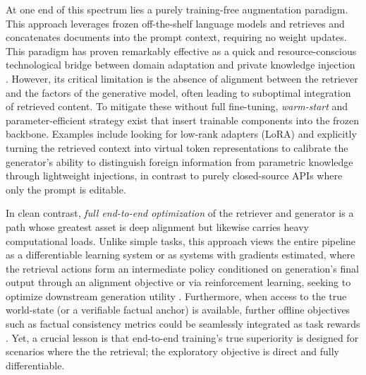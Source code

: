 \documentclass[11pt,a4paper]{article}
\begin{document}
At one end of this spectrum lies a purely training-free augmentation paradigm. This approach leverages frozen off-the-shelf language models and retrieves and concatenates documents into the prompt context, requiring no weight updates. This paradigm has proven remarkably effective as a quick and resource-conscious technological bridge between domain adaptation and private knowledge injection \cite{arxiv:2405.07437v2}. However, its critical limitation is the absence of alignment between the retriever and the factors of the generative model, often leading to suboptimal integration of retrieved content. To mitigate these without full fine-tuning, \emph{warm-start} and parameter-efficient strategy exist that insert trainable components into the frozen backbone. Examples include looking for low-rank adapters (LoRA) and explicitly turning the retrieved context into virtual token representations to calibrate the generator's ability to distinguish foreign information from parametric knowledge through lightweight injections, in contrast to purely closed-source APIs where only the prompt is editable.

In clean contrast, \emph{full end-to-end optimization} of the retriever and generator is a path whose greatest asset is deep alignment but likewise carries heavy computational loads. Unlike simple tasks, this approach views the entire pipeline as a differentiable learning system or as systems with gradients estimated, where the retrieval actions form an intermediate policy conditioned on generation's final output through an alignment objective or via reinforcement learning, seeking to optimize downstream generation utility \cite{arxiv:2305.14627v2}. Furthermore, when access to the true world-state (or a verifiable factual anchor) is available, further offline objectives such as factual consistency metrics could be seamlessly integrated as task rewards \cite{arxiv:2311.08401v1}. Yet, a crucial lesson is that end-to-end training's true superiority is designed for scenarios where the the retrieval; the exploratory objective is direct and fully differentiable.
\end{document}
